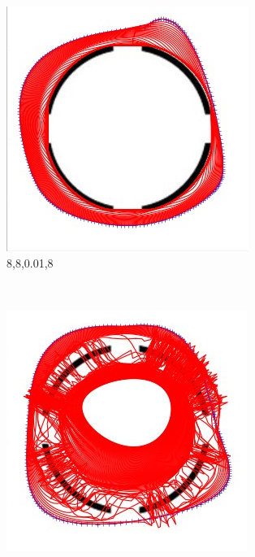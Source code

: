 \documentclass[paper=a4, fontsize=11pt]{scrartcl} %
\numberwithin{equation}{section} %
\numberwithin{figure}{section} %
\numberwithin{table}{section} %
\begin{document}
\begin{figure}[H]
\begin{subfigure}[b]{0.2\textwidth}
                \includegraphics[width=\textwidth]{311}
                \caption{8,8,0.01,8}
                \label{fig:Gestaltcircle5}
        \end{subfigure}
        ~ %
        \begin{subfigure}[b]{0.2\textwidth}
                \includegraphics[width=\textwidth]{308}

\end{subfigure}
\end{figure}
\end{document}
